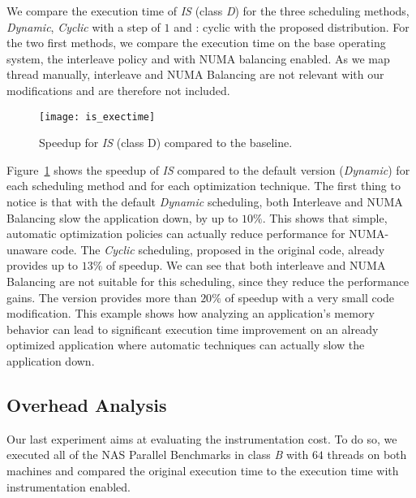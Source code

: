 We compare the execution time of \emph{IS} (class \emph{D}) for the three scheduling
methods, \emph{Dynamic}, \emph{Cyclic} with a step of $1$ and \TABARNAC:
cyclic with the proposed distribution. For the two first methods, we compare the
execution time on the base operating system, the interleave policy and with
NUMA balancing enabled. As we map thread manually, interleave and NUMA
Balancing are not relevant with our modifications and are therefore not included.

\begin{figure}[htb]
    \centering
    \texttt{[image: is\_exectime]}
    \caption{Speedup for \emph{IS} (class D) compared to the baseline.}
\label{fig:is-res}
\end{figure}

Figure~\ref{fig:is-res} shows the speedup of \emph{IS} compared to
the default version (\emph{Dynamic}) for each scheduling method and for each
optimization technique. The first thing to notice is that with the default
\emph{Dynamic} scheduling, both Interleave and NUMA Balancing slow
the application down, by up to $10\%$. This shows that simple, automatic optimization policies can actually reduce performance
for NUMA-unaware code.
The \emph{Cyclic} scheduling, proposed in the original code, already provides up to $13\%$ of
speedup. We can see that both interleave and NUMA Balancing are not suitable
for this scheduling, since they reduce the performance gains.
The \TABARNAC version provides more than $20\%$ of speedup with a very small code
modification.
This example shows how analyzing an application's memory behavior can lead to
significant execution time improvement on an already optimized application where automatic techniques can actually slow
the application down.




\subsection{Overhead Analysis}
\label{sec:expe-overhead}

Our last experiment aims at evaluating the instrumentation cost. To do so, we
executed all of the NAS Parallel Benchmarks in class \emph{B} with $64$
threads on both machines and compared the original execution time to the execution time with instrumentation enabled.


